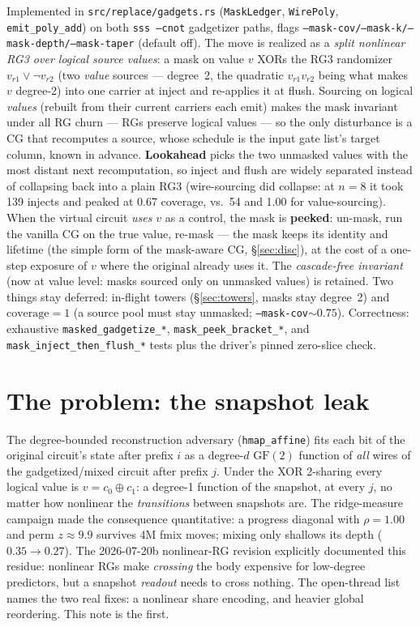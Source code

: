 \documentclass[11pt]{article}
\newcommand{\code}[1]{\texttt{#1}}
\newcommand{\gf}{\mathrm{GF}(2)}
\begin{document}
Implemented in \code{src/replace/gadgets.rs} (\code{MaskLedger},
\code{WirePoly}, \code{emit\_poly\_add}) on both \code{sss --cnot}
gadgetizer paths, flags \code{--mask-cov/--mask-k/--mask-depth/--mask-taper}
(default off). The move is realized as a \emph{split nonlinear RG3 over
logical source values}: a mask on value $v$ XORs the RG3 randomizer
$v_{r1} \vee \lnot v_{r2}$ (two \emph{value} sources --- degree~2, the
quadratic $v_{r1} v_{r2}$ being what makes $v$ degree-2) into one carrier
at inject and re-applies it at flush. Sourcing on logical \emph{values}
(rebuilt from their current carriers each emit) makes the mask invariant
under all RG churn --- RGs preserve logical values --- so the only
disturbance is a CG that recomputes a source, whose schedule is the input
gate list's target column, known in advance. \textbf{Lookahead} picks the
two unmasked values with the most distant next recomputation, so inject and
flush are widely separated instead of collapsing back into a plain RG3
(wire-sourcing did collapse: at $n{=}8$ it took 139 injects and peaked at
0.67 coverage, vs.\ 54 and 1.00 for value-sourcing). When the virtual
circuit \emph{uses} $v$ as a control, the mask is \textbf{peeked}: un-mask,
run the vanilla CG on the true value, re-mask --- the mask keeps its
identity and lifetime (the simple form of the mask-aware CG,
\S\ref{sec:disc}), at the cost of a one-step exposure of $v$ where the
original already uses it. The \emph{cascade-free invariant} (now at value
level: masks sourced only on unmasked values) is retained. Two things stay
deferred: in-flight towers (\S\ref{sec:towers}, masks stay degree~2) and
$\text{coverage}{=}1$ (a source pool must stay unmasked;
\code{--mask-cov}${\sim}0.75$). Correctness: exhaustive
\code{masked\_gadgetize\_*}, \code{mask\_peek\_bracket\_*}, and
\code{mask\_inject\_then\_flush\_*} tests plus the driver's pinned
zero-slice check.

\section{The problem: the snapshot leak}

The degree-bounded reconstruction adversary (\code{hmap\_affine}) fits
each bit of the original circuit's state after prefix $i$ as a degree-$d$
$\gf$ function of \emph{all} wires of the gadgetized/mixed circuit after
prefix $j$. Under the XOR 2-sharing every logical value is
$v = c_0 \oplus c_1$: a degree-1 function of the snapshot, at every $j$,
no matter how nonlinear the \emph{transitions} between snapshots are. The
ridge-measure campaign made the consequence quantitative: a progress
diagonal with $\rho = 1.00$ and perm $z \approx 9.9$ survives 4M fmix
moves; mixing only shallows its depth ($0.35 \to 0.27$). The 2026-07-20b
nonlinear-RG revision explicitly documented this residue: nonlinear RGs
make \emph{crossing} the body expensive for low-degree predictors, but a
snapshot \emph{readout} needs to cross nothing. The open-thread list names
the two real fixes: a nonlinear share encoding, and heavier global
reordering. This note is the first.
\end{document}
